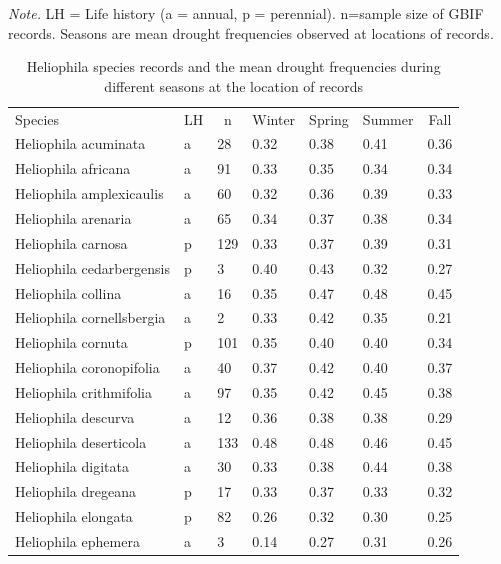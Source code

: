 \documentclass[man,floatsintext]{apa6}
\makeatletter
\newcommand\LastLTentrywidth{1em}
\newlength\longtablewidth
\newcommand{\getlongtablewidth}{\begingroup \ifcsname LT@\roman{LT@tables}\endcsname \global\longtablewidth=0pt \renewcommand{\LT@entry}[2]{\global\advance\longtablewidth by ##2\relax\gdef\LastLTentrywidth{##2}}\@nameuse{LT@\roman{LT@tables}} \fi \endgroup}
\theoremstyle{definition}
\theoremstyle{definition}
\theoremstyle{definition}
\theoremstyle{remark}
\makeatother
\begin{document}
\begin{center}
\begin{ThreePartTable}
\begin{TableNotes}[para]
\normalsize{\textit{Note.} LH = Life history (a = annual, p = perennial). n=sample size of GBIF records. Seasons are mean drought frequencies observed at locations of records.}
\end{TableNotes}
\small{
\begin{longtable}{lllllll}\noalign{\getlongtablewidth\global\LTcapwidth=\longtablewidth}
\caption{\label{tab:speciesmeanstable}Heliophila species records and the mean drought frequencies during different seasons at the location of records }\\
\toprule
Species & \multicolumn{1}{c}{LH} & \multicolumn{1}{c}{n} & \multicolumn{1}{c}{Winter} & \multicolumn{1}{c}{Spring} & \multicolumn{1}{c}{Summer} & \multicolumn{1}{c}{Fall}\\
\midrule
Heliophila acuminata & a & 28 & 0.32 & 0.38 & 0.41 & 0.36\\
Heliophila africana & a & 91 & 0.33 & 0.35 & 0.34 & 0.34\\
Heliophila amplexicaulis & a & 60 & 0.32 & 0.36 & 0.39 & 0.33\\
Heliophila arenaria & a & 65 & 0.34 & 0.37 & 0.38 & 0.34\\
Heliophila carnosa & p & 129 & 0.33 & 0.37 & 0.39 & 0.31\\
Heliophila cedarbergensis & p & 3 & 0.40 & 0.43 & 0.32 & 0.27\\
Heliophila collina & a & 16 & 0.35 & 0.47 & 0.48 & 0.45\\
Heliophila cornellsbergia & a & 2 & 0.33 & 0.42 & 0.35 & 0.21\\
Heliophila cornuta & p & 101 & 0.35 & 0.40 & 0.40 & 0.34\\
Heliophila coronopifolia & a & 40 & 0.37 & 0.42 & 0.40 & 0.37\\
Heliophila crithmifolia & a & 97 & 0.35 & 0.42 & 0.45 & 0.38\\
Heliophila descurva & a & 12 & 0.36 & 0.38 & 0.38 & 0.29\\
Heliophila deserticola & a & 133 & 0.48 & 0.48 & 0.46 & 0.45\\
Heliophila digitata & a & 30 & 0.33 & 0.38 & 0.44 & 0.38\\
Heliophila dregeana & p & 17 & 0.33 & 0.37 & 0.33 & 0.32\\
Heliophila elongata & p & 82 & 0.26 & 0.32 & 0.30 & 0.25\\
Heliophila ephemera & a & 3 & 0.14 & 0.27 & 0.31 & 0.26\\

\end{longtable}}
\end{ThreePartTable}
\end{center}
\end{document}
